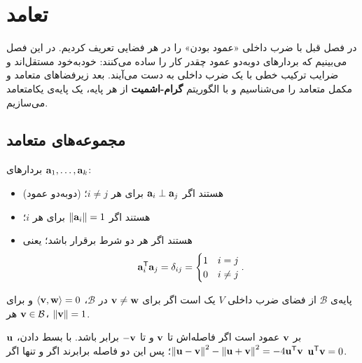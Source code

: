 \chapter{تعامد}
\label{ch:orthogonality}

در فصل قبل با ضرب داخلی  «عمود بودن» را در هر فضایی تعریف کردیم. در این فصل می‌بینیم که بردارهای دوبه‌دو عمود چقدر کار را ساده می‌کنند: خودبه‌خود مستقل‌اند و ضرایب ترکیب خطی  با یک ضرب داخلی به دست می‌آیند. بعد زیرفضاهای  متعامد و مکمل متعامد را می‌شناسیم و با الگوریتم \textbf{گرام-اشمیت} از هر پایه، یک پایه‌ی  یکامتعامد می‌سازیم.

\section{مجموعه‌های متعامد}

\begin{definition}
بردارهای $\mathbf{a}_1,\dots,\mathbf{a}_k$:
\begin{itemize}
  \item {} (دوبه‌دو عمود) هستند اگر $\mathbf{a}_i\perp\mathbf{a}_j$ برای هر $i\neq j$؛
  \item {} هستند اگر $\left\lVert \mathbf{a}_i\right\rVert=1$ برای هر $i$؛
  \item {} هستند اگر هر دو شرط برقرار باشد؛ یعنی
  \[
  \mathbf{a}_i^{\mathsf{T}}\mathbf{a}_j=\delta_{ij}=\begin{cases}1 & i=j\\ 0 & i\neq j\end{cases}.
  \]
\end{itemize}
پایه‌ی $\mathcal{B}$ از فضای ضرب داخلی  $V$ یک  است اگر برای $\mathbf{v}\neq\mathbf{w}$ در $\mathcal{B}$، $\left\langle \mathbf{v},\mathbf{w}\right\rangle=0$ و برای هر $\mathbf{v}\in\mathcal{B}$، $\left\lVert \mathbf{v}\right\rVert=1$.
\end{definition}

\begin{intuition}
$\mathbf{u}$ بر $\mathbf{v}$ عمود است اگر فاصله‌اش تا $\mathbf{v}$ و تا $-\mathbf{v}$ برابر باشد. با بسط دادن،
$\left\lVert \mathbf{u}-\mathbf{v}\right\rVert^2-\left\lVert \mathbf{u}+\mathbf{v}\right\rVert^2=-4\mathbf{u}^{\mathsf{T}}\mathbf{v}$؛
پس این دو فاصله برابرند اگر و تنها اگر $\mathbf{u}^{\mathsf{T}}\mathbf{v}=0$.
\begin{center}
\end{center}
\end{intuition}

